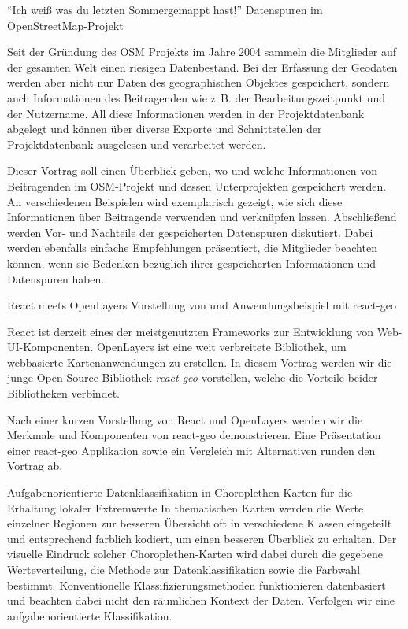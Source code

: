 %
{"`Ich weiß was du letzten Sommer\linebreak gemappt hast!"'}%
{Datenspuren im OpenStreetMap-Projekt}%
{%
Seit der Gründung des OSM Projekts im Jahre 2004 sammeln die Mitglieder auf
der gesamten Welt einen riesigen Datenbestand. Bei der Erfassung der Geodaten
werden aber nicht nur Daten des geographischen Objektes gespeichert, sondern
auch Informationen des Beitragenden wie z.\,B. der Bearbeitungszeitpunkt und
der Nutzername. All diese Informationen werden in der Projektdatenbank
abgelegt und können über diverse Exporte und Schnittstellen der
Projektdatenbank ausgelesen und verarbeitet werden.

Dieser Vortrag soll einen Überblick geben, wo und welche Informationen von
Beitragenden im OSM-Projekt und dessen Unterprojekten gespeichert werden. An
verschiedenen Beispielen wird exemplarisch gezeigt, wie sich diese
Informationen über Beitragende verwenden und verknüpfen lassen. Abschließend
werden Vor- und Nachteile der gespeicherten Datenspuren diskutiert. Dabei
werden ebenfalls einfache Empfehlungen präsentiert, die Mitglieder beachten
können, wenn sie Bedenken bezüglich ihrer gespeicherten Informationen und
Datenspuren haben.%
}

%
{React meets OpenLayers}%
{Vorstellung von und Anwendungsbeispiel mit react-geo}%
{%
React ist derzeit eines der meistgenutzten Frameworks zur Entwicklung von
Web-UI-Komponenten. OpenLayers ist eine weit verbreitete Bibliothek, um
webbasierte Kartenanwendungen zu erstellen. In diesem Vortrag werden wir die
junge Open-Source-Bibliothek \emph{react-geo} vorstellen, welche die Vorteile beider
Bibliotheken verbindet.

Nach einer kurzen Vorstellung von React und OpenLayers werden wir die Merkmale
und Komponenten von react-geo demonstrieren. Eine Präsentation einer react-geo
Applikation sowie ein Vergleich mit Alternativen runden den Vortrag ab.%
}

\vspace{-0.2em}
%
{Aufgabenorientierte Datenklassi\-fikation in Choroplethen-Karten für die Erhaltung lokaler Extremwerte}%
{}%
{%
In thematischen Karten werden die Werte einzelner Regionen zur besseren
Übersicht oft in verschiedene Klassen eingeteilt und entsprechend farblich
kodiert, um einen besseren Überblick zu erhalten. Der visuelle Eindruck solcher
Choroplethen-Karten wird dabei durch die gegebene Werteverteilung, die Methode
zur Datenklassifikation sowie die Farbwahl bestimmt. Konventionelle
Klassifizierungsmethoden funktionieren datenbasiert und beachten dabei nicht
den räumlichen Kontext der Daten. Verfolgen wir eine aufgabenorientierte
Klassifikation.%
}


